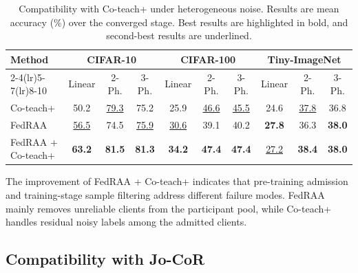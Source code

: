 \documentclass[conference]{IEEEtran}
\theoremstyle{definition}
\theoremstyle{remark}
\begin{document}
\begin{table}[t]
\centering
\caption{Compatibility with Co-teach+ under heterogeneous noise. Results are mean accuracy (\%) over the converged stage. Best results are highlighted in bold, and second-best results are underlined.}
\label{tab:coteach_merged}
\setlength{\tabcolsep}{4pt}
\renewcommand{\arraystretch}{1.10}
\begin{tabular*}{\textwidth}{@{\extracolsep{\fill}}lccccccccc@{}}
\toprule
\multirow{2}{*}{Method}
& \multicolumn{3}{c}{CIFAR-10}
& \multicolumn{3}{c}{CIFAR-100}
& \multicolumn{3}{c}{Tiny-ImageNet} \\
\cmidrule(lr){2-4}\cmidrule(lr){5-7}\cmidrule(lr){8-10}
& Linear & 2-Ph. & 3-Ph.
& Linear & 2-Ph. & 3-Ph.
& Linear & 2-Ph. & 3-Ph. \\
\midrule
Co-teach+
& 50.2 & \underline{79.3} & 75.2
& 25.9 & \underline{46.6} & \underline{45.5}
& 24.6 & \underline{37.8} & 36.8 \\
FedRAA
& \underline{56.5} & 74.5 & \underline{75.9}
& \underline{30.6} & 39.1 & 40.2
& \textbf{27.8} & 36.3 & \textbf{38.0} \\
\midrule
FedRAA + Co-teach+
& \textbf{63.2} & \textbf{81.5} & \textbf{81.3}
& \textbf{34.2} & \textbf{47.4} & \textbf{47.4}
& \underline{27.2} & \textbf{38.4} & \textbf{38.0} \\
\bottomrule
\end{tabular*}
\vspace{2pt}
\parbox{0.95\textwidth}{\footnotesize
The improvement of FedRAA + Co-teach+ indicates that pre-training admission and training-stage sample filtering address different failure modes. FedRAA mainly removes unreliable clients from the participant pool, while Co-teach+ handles residual noisy labels among the admitted clients.}
\end{table}


\subsection{Compatibility with Jo-CoR}
\end{document}
